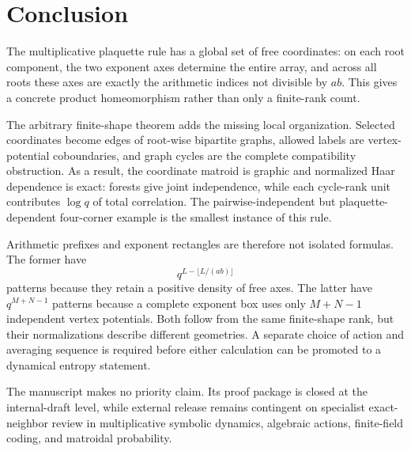\section{Conclusion}

The multiplicative plaquette rule has a global set of free coordinates: on
each root component, the two exponent axes determine the entire array, and
across all roots these axes are exactly the arithmetic indices not divisible
by $ab$.  This gives a concrete product homeomorphism rather than only a
finite-rank count.

The arbitrary finite-shape theorem adds the missing local organization.
Selected coordinates become edges of root-wise bipartite graphs, allowed
labels are vertex-potential coboundaries, and graph cycles are the complete
compatibility obstruction.  As a result, the coordinate matroid is graphic
and normalized Haar dependence is exact: forests give joint independence,
while each cycle-rank unit contributes $\log q$ of total correlation.  The
pairwise-independent but plaquette-dependent four-corner example is the
smallest instance of this rule.

Arithmetic prefixes and exponent rectangles are therefore not isolated
formulas.  The former have
\[
 q^{L-\lfloor L/(ab)\rfloor}
\]
patterns because they retain a positive density of free axes.  The latter
have $q^{M+N-1}$ patterns because a complete exponent box uses only $M+N-1$
independent vertex potentials.  Both follow from the same finite-shape rank,
but their normalizations describe different geometries.  A separate choice
of action and averaging sequence is required before either calculation can be
promoted to a dynamical entropy statement.

The manuscript makes no priority claim.  Its proof package is closed at the
internal-draft level, while external release remains contingent on specialist
exact-neighbor review in multiplicative symbolic dynamics, algebraic actions,
finite-field coding, and matroidal probability.

